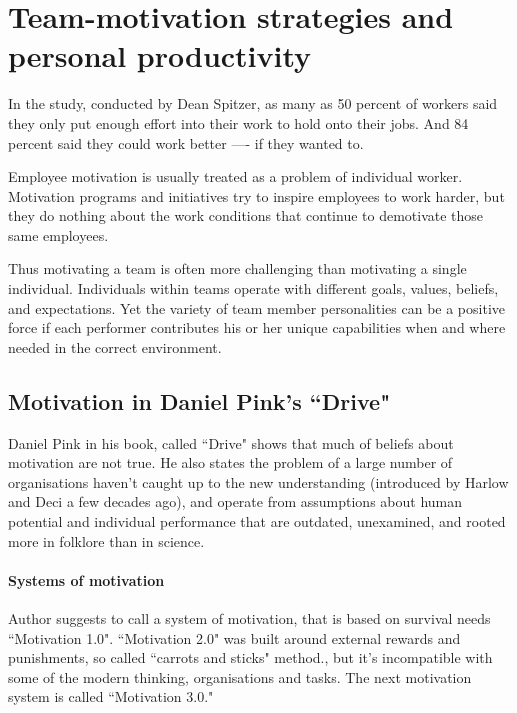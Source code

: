 \chapter{Team-motivation strategies and personal productivity}
\label{chap:strategies}

In the study, conducted by Dean Spitzer, as many as 50 percent of workers said they only put enough effort into their work to hold onto their jobs. And 84 percent said they could work better —- if they wanted to. \cite{spitzer}

Employee motivation is usually treated as a problem of individual worker. Motivation programs and initiatives try to inspire employees to work harder, but they do nothing about the work conditions that continue to demotivate those same employees.

Thus motivating a team is often more challenging than motivating a single individual. Individuals within teams operate with different goals, values, beliefs, and expectations. Yet the variety of team member personalities can be a positive force if each performer contributes his or her unique capabilities when and where needed \cite{clark-team-motivation} in the correct environment.

\section{Motivation in Daniel Pink's ``Drive"}

Daniel Pink in his book, called ``Drive" shows that much of beliefs about motivation are not true. He also states the problem of a large number of organisations haven't caught up to the new understanding (introduced by Harlow and Deci a few decades ago), and operate from assumptions about human potential and individual performance that are outdated, unexamined, and rooted more in folklore than in science.

\subsubsection{Systems of motivation}

Author suggests to call a system of motivation, that is based on survival needs ``Motivation 1.0". ``Motivation 2.0" was built around external rewards and punishments, so called ``carrots and sticks" method., but it's incompatible with some of the modern thinking, organisations and tasks. The next motivation system is called ``Motivation 3.0."

